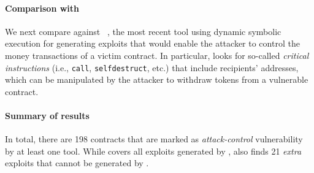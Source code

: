 \paragraph{\bf{Comparison with \teether}}\label{sec:teether}
We next compare \toolname against \teether~\cite{teether}, the most recent
tool using dynamic symbolic execution for generating exploits that would enable
the attacker to control the money transactions of a victim contract. In
particular, \teether looks for so-called \emph{critical instructions}
(i.e., \texttt{call}, \texttt{selfdestruct}, etc.) that include recipients' addresses, 
which can be manipulated by the attacker to withdraw
tokens from a vulnerable contract. 

\paragraph{Summary of results}

In total, there are 198 contracts that are marked as \emph{attack-control} vulnerability by at
least one tool. While \toolname covers all exploits generated by
\teether, \toolname also finds 21 \emph{extra} exploits that cannot be generated
by \teether. 


